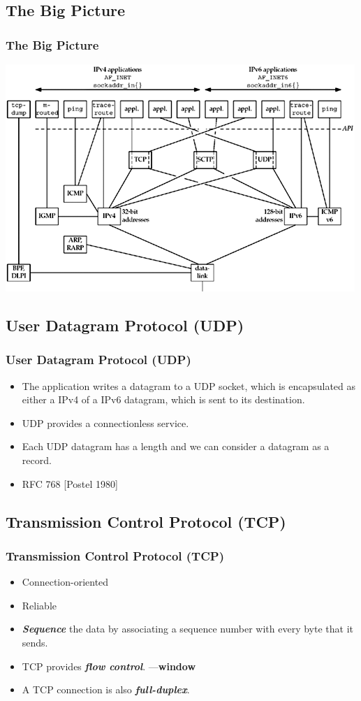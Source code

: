 \documentclass[notes,serif]{beamer}
\begin{document}
\subsection{The Big Picture}
\begin{frame}
  \frametitle{The Big Picture}
  \begin{center}
  \includegraphics[width=.8\textwidth]{figs/02fig01.png}
  \end{center}
\end{frame}

\subsection{User Datagram Protocol (UDP)}
\begin{frame}
  \frametitle{User Datagram Protocol (UDP)}
  \begin{itemize}
    \item The application writes a datagram to a UDP socket, which is encapsulated as either a IPv4 of a IPv6 datagram, which is sent to its destination.
    \item UDP provides a connectionless service.
    \item Each UDP datagram has a length and we can consider a datagram as a record.
    \item RFC 768 [Postel 1980]
  \end{itemize}
\end{frame}

\subsection{Transmission Control Protocol (TCP)}
\begin{frame}
  \frametitle{Transmission Control Protocol (TCP)}
  \begin{itemize}
    \item Connection-oriented
    \item Reliable
    \item {\bf \em Sequence} the data by associating a sequence number with every byte that it sends.
    \item TCP provides {\bf \em flow control}. ---{\bf window}
    \item A TCP connection is also {\bf \em full-duplex}.
  \end{itemize}
\end{frame}
\end{document}
